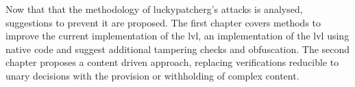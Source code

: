Now that that the methodology of \gls{luckypatcherg}'s attacks is analysed, suggestions to prevent it are proposed.
\newline
The first chapter covers methods to improve the current implementation of the \gls{lvl}, an implementation of the \gls{lvl} using native code and suggest additional tampering checks and obfuscation.
\newline
The second chapter proposes a content driven approach, replacing verifications reducible to unary decisions with the provision or withholding of complex content.
